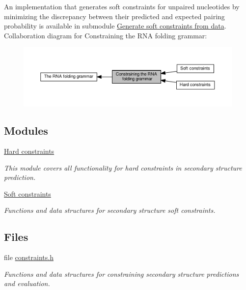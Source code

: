 An implementation that generates soft constraints for unpaired nucleotides by minimizing the discrepancy between their predicted and expected pairing probability is available in submodule \hyperlink{group__perturbation}{Generate soft constraints from data}. Collaboration diagram for Constraining the R\+NA folding grammar\+:
\nopagebreak
\begin{figure}[H]
\begin{center}
\leavevmode
\includegraphics[width=350pt]{group__constraints}
\end{center}
\end{figure}
\subsection*{Modules}
\begin{DoxyCompactItemize}
\item 
\hyperlink{group__hard__constraints}{Hard constraints}
\begin{DoxyCompactList}\small\item\em This module covers all functionality for hard constraints in secondary structure prediction. \end{DoxyCompactList}\item 
\hyperlink{group__soft__constraints}{Soft constraints}
\begin{DoxyCompactList}\small\item\em Functions and data structures for secondary structure soft constraints. \end{DoxyCompactList}\end{DoxyCompactItemize}
\subsection*{Files}
\begin{DoxyCompactItemize}
\item 
file \hyperlink{constraints_8h}{constraints.\+h}
\begin{DoxyCompactList}\small\item\em Functions and data structures for constraining secondary structure predictions and evaluation. \end{DoxyCompactList}\end{DoxyCompactItemize}
